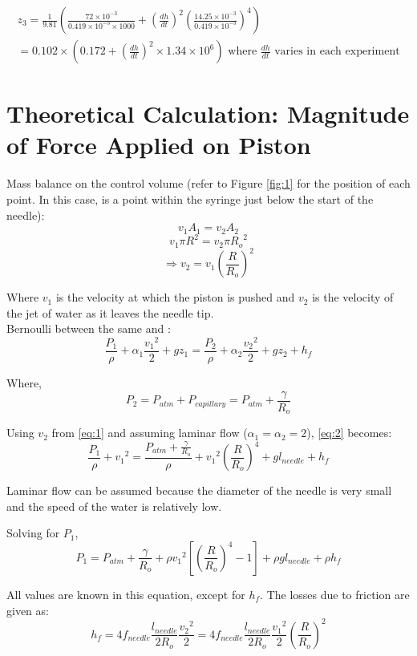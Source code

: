 \documentclass{article}
\newcommand*\circled[1]{\tikz[baseline=(char.base)]{
            \node[shape=circle,draw,inner sep=2pt] (char) {#1};}}
\begin{document}
\begin{multline*}
z_3 = \frac{1}{9.81} (\frac{72\times10^{-3}}{0.419\times10^{-3} \times 1000} + (\frac{dh}{dt})^2(\frac{14.25\times10^{-3}}{0.419\times10^{-3}})^4)\\= 0.102\times(0.172 + (\frac{dh}{dt})^2 \times1.34\times{10^6}) \textrm{ where $\frac{dh}{dt}$ varies in each experiment}
\end{multline*}

\section{Theoretical Calculation: Magnitude of Force Applied on Piston}

Mass balance on the control volume (refer to Figure \ref{fig:1} for the position of each point. In this case, \circled{1} is a point within the syringe just below the start of the needle):
\[ v_{1}A_{1} = v_{2}A_{2} \]
\[ v_{1}\pi{R}^2 = v_{2}\pi{R_{o}}^2 \]
\[ \Rightarrow v_{2} = v_{1} \left(\frac{R}{R_{o}}\right)^2 \tag{2-1} \label{eq:1} \]

Where $v_{1}$ is the velocity at which the piston is pushed and $v_{2}$ is the velocity of the jet of water as it leaves the needle tip. \\

Bernoulli between the same \circled{1} and \circled{2} :
\[ \frac{P_{1}}{\rho} + \alpha_{1}\frac{{v_{1}}^2}{2}  + gz_{1} = \frac{P_{2}}{\rho} + \alpha_{2}\frac{{v_{2}}^2}{2}  + gz_{2} + h_{f} \tag{2-2} \label{eq:2} \]

Where,
\[ P_{2} = P_{atm} + P_{capillary}  = P_{atm} + \frac{\gamma}{R_{o}} \]


Using $v_{2}$ from \eqref{eq:1} and assuming laminar flow ($\alpha_{1} = \alpha_{2} = 2$), \eqref{eq:2} becomes:
\[ \frac{P_{1}}{\rho} + {v_{1}}^2 = \frac{P_{atm} + \frac{\gamma}{R_{o}}}{\rho} + {v_{1}}^2\left(\frac{R}{R_{o}}\right)^4  + gl_{needle} + h_{f} \]

Laminar flow can be assumed because the diameter of the needle is very small and the speed of the water is relatively low.

Solving for $P_{1}$,
\[ P_{1} = P_{atm} + \frac{\gamma}{R_{o}} + \rho{v_{1}}^2\left[\left(\frac{R}{R_{o}}\right)^4  - 1 \right] + \rho gl_{needle} + \rho h_{f} \tag{2-3} \label{eq:3} \]

All values are known in this equation, except for $h_{f}$. The losses due to friction are given as:
\[ h_{f} = 4f_{needle} \frac{l_{needle}}{2R_{o}} \frac{{v_{2}}^2}{2} = 4f_{needle} \frac{l_{needle}}{2R_{o}} \frac{{v_{1}}^2}{2} \left(\frac{R}{R_{o}}\right)^2 \tag{2-4} \label{eq:4} \]
\end{document}
